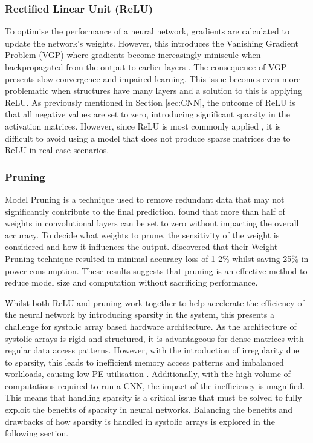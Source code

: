 \documentclass[12pt, a4paper, ukenglish]{article}
\begin{document}
        \subsubsection{Rectified Linear Unit (ReLU)} \label{sec:relu}
        To optimise the performance of a neural network, gradients are calculated to update the network's weights. However, this introduces the Vanishing Gradient Problem (VGP) where gradients become increasingly miniscule when backpropagated from the output to earlier layers \cite{tan_vanishing_2019}. The consequence of VGP presents slow convergence and impaired learning. This issue becomes even more problematic when structures have many layers and a solution to this is applying ReLU. As previously mentioned in Section \ref{sec:CNN}, the outcome of ReLU is that all negative values are set to zero, introducing significant sparsity in the activation matrices. However, since ReLU is most commonly applied \cite{sun_sense_2023}, it is difficult to avoid using a model that does not produce sparse matrices due to ReLU in real-case scenarios.


    
        \subsubsection{Pruning} 

    Model Pruning is a technique used to remove redundant data that may not significantly contribute to the final prediction. \textcite{kim_fpga_2021} found that more than half of weights in convolutional layers can be set to zero without impacting the overall accuracy. To decide what weights to prune, the sensitivity of the weight is considered and how it influences the output. \textcite{gorvadiya_energy_2025} discovered that their Weight Pruning technique resulted in minimal accuracy loss of 1-2\% whilst saving 25\% in power consumption. These results suggests that pruning is an effective method to reduce model size and computation without sacrificing performance.

    Whilst both ReLU and pruning work together to help accelerate the efficiency of the neural network by introducing sparsity in the system, this presents a challenge for systolic array based hardware architecture.
    As the architecture of systolic arrays is rigid and structured, it is advantageous for dense matrices with regular data access patterns. However, with the introduction of irregularity due to sparsity, this leads to inefficient memory access patterns and imbalanced workloads, causing low PE utilisation \cite{he_sparse-tpu_2020}. Additionally, with the high volume of computations required to run a CNN, the impact of the inefficiency is magnified. This means that handling sparsity is a critical issue that must be solved to fully exploit the benefits of sparsity in neural networks. Balancing the benefits and drawbacks of how sparsity is handled in systolic arrays is explored in the following section.
\end{document}
